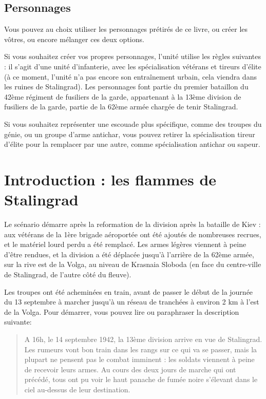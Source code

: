 \documentclass{report}
\begin{document}
\begin{multicols}{2}
\subsection{Personnages}
Vous pouvez au choix utiliser les personnages prétirés de ce livre, ou créer les vôtres, ou encore mélanger ces deux options.

Si vous souhaitez créer vos propres personnages, l'unité utilise les règles suivantes : il s'agit d'une unité d'infanterie, avec les spécialisation vétérans et tireurs d'élite (à ce moment, l'unité n'a pas encore son entraînement urbain, cela viendra dans les ruines de Stalingrad). Les personnages font partie du premier bataillon du 42ème régiment de fusiliers de la garde, appartenant à la 13ème division de fusiliers de la garde, partie de la 62ème armée chargée de tenir Stalingrad.


Si vous souhaitez représenter une escouade plus spécifique, comme des troupes du génie, ou un groupe d'arme antichar, vous pouvez retirer la spécialisation tireur d'élite pour la remplacer par une autre, comme spécialisation antichar ou sapeur. 

\section{Introduction : les flammes de Stalingrad}
Le scénario démarre après la reformation de la division après la bataille de Kiev : aux vétérans de la 1ère brigade aéroportée ont été ajoutés de nombreuses recrues, et le matériel lourd perdu a été remplacé. Les armes légères viennent à peine d'être rendues, et la division a été déplacée jusqu'à l'arrière de la 62ème armée, sur la rive est de la Volga, au niveau de Krasnaia Sloboda (en face du centre-ville de Stalingrad, de l'autre côté du fleuve).

Les troupes ont été acheminées en train, avant de passer le début de la journée du 13 septembre à marcher jusqu'à un réseau de tranchées à environ 2 km à l'est de la Volga. Pour démarrer, vous pouvez lire ou paraphraser la description suivante:
\begin{quotation}
A 16h, le 14 septembre 1942, la 13ème division arrive en vue de Stalingrad. Les rumeurs vont bon train dans les rangs sur ce qui va se passer, mais la plupart ne pensent pas le combat imminent : les soldats viennent à peine de recevoir leurs armes. Au cours des deux jours de marche qui ont précédé, tous ont pu voir le haut panache de fumée noire s'élevant dans le ciel au-dessus de leur destination.


\end{quotation}
\end{multicols}
\end{document}
